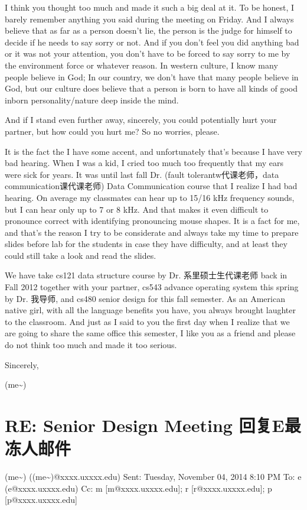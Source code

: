 \documentclass[12pt]{book}
\begin{document}
I think you thought too much and made it such a big deal at it. To be honest, I barely remember anything you said during the meeting on Friday. And I always believe that as far as a person doesn't lie, the person is the judge for himself to decide if he needs to say sorry or not. And if you don't feel you did anything bad or it was not your attention, you don't have to be forced to say sorry to me by the environment force or whatever reason. In western culture, I know many people believe in God; In our country, we don't have that many people believe in God, but our culture does believe that a person is born to have all kinds of good inborn personality/nature deep inside the mind. 

And if I stand even further away, sincerely,  you could potentially hurt your partner, but how could you hurt me? So no worries, please. 

It is the fact the I have some accent, and unfortunately that's because I have very bad hearing. When I was a kid, I cried too much too frequently that my ears were sick for years. It was until last fall Dr. (fault tolerantw代课老师，data communication课代课老师) Data Communication course that I realize I had bad hearing. On average my classmates can hear up to 15/16 kHz frequency sounds, but I can hear only up to 7 or 8 kHz. And that makes it even difficult to pronounce correct with identifying pronouncing mouse shapes. It is a fact for me, and that's the reason I try to be considerate and always take my time to prepare slides before lab for the students in case they have difficulty, and at least they could still take a look and read the slides.


We have take cs121 data structure course by Dr. 系里硕士生代课老师 back in Fall 2012 together with your partner, cs543 advance operating system this spring by Dr. 我导师, and cs480 senior design for this fall semester. As an American native girl, with all the language benefits you have, you always brought laughter to the classroom. And just as I said to you the first day when I realize that we are going to share the same office this semester, I like you as a friend and please do not think too much and made it too serious. 

Sincerely, 

(me\textasciitilde{})  

\section{RE: Senior Design Meeting 回复E最冻人邮件}
\label{sec-23-3}
(me\textasciitilde{}) ((me\textasciitilde{})@xxxx.uxxxx.edu)
Sent:        Tuesday, November 04, 2014 8:10 PM
To:        
e (e@xxxx.uxxxx.edu)
Cc:        
m [m@xxxx.uxxxx.edu]; r [r@xxxx.uxxxx.edu]; p [p@xxxx.uxxxx.edu]
\end{document}
